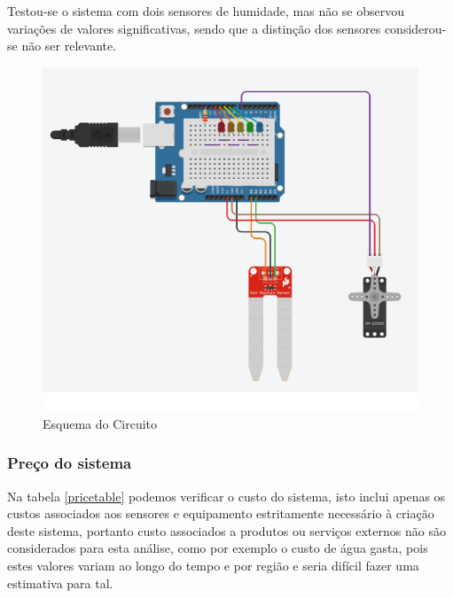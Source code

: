 \documentclass[conference]{IEEEtran}
\begin{document}
Testou-se o sistema com dois sensores de humidade, mas não se observou variações de valores significativas, 
sendo que a distinção dos sensores considerou-se não ser relevante.

\begin{figure}
    \centering
    \includegraphics[scale=0.5]{soil-moisture-circuit-schema.png}
    \caption{Esquema do Circuito}
    \label{fig:circuit}
\end{figure}

\subsubsection{Preço do sistema}

Na tabela \ref{pricetable} podemos verificar o custo do sistema, 
isto inclui apenas os custos associados aos sensores e equipamento 
estritamente necessário à criação deste sistema, portanto custo associados 
a produtos ou serviços externos não são considerados para esta análise, 
como por exemplo o custo de água gasta, pois estes valores variam ao longo 
do tempo e por região e seria difícil fazer uma estimativa para tal.
\end{document}
